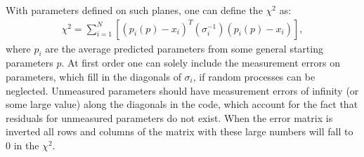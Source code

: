 
    With parameters defined on such planes, one can define the $\chi^{2}$ as: 
        \begin{align} \label{eq:chi2sum}
            \chi^2 = \sum_{i=1}^{N} [(p_{i}(p)-x_{i})^{T} (\sigma_{i}^{-1}) (p_{i}(p)-x_{i})],
        \end{align}
    where $p_{i}$ are the average predicted parameters from some general starting parameters $p$. At first order one can solely include the measurement errors on parameters, which fill in the diagonals of $\sigma_{i}$, if random processes can be neglected. Unmeasured parameters should have measurement errors of infinity (or some large value) along the diagonals in the code, which account for the fact that residuals for unmeasured parameters do not exist. When the error matrix is inverted all rows and columns of the matrix with these large numbers will fall to 0 in the $\chi^{2}$. 


